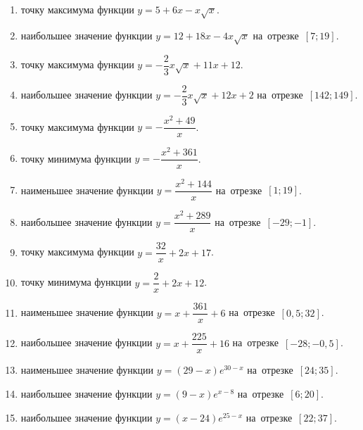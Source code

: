 \documentclass[a4paper,10pt]{article}
\begin{document}
\begin{enumerate}
\item {} точку максимума функции $y=5+6x -x\sqrt{x}$.

\item {} наибольшее значение функции $y=12+18x -4x\sqrt{x}$ на~отрезке~$\left[7;19\right]$.

\item {} точку максимума функции $y=-\dfrac{2}{3}x\sqrt{x} +11x+12$.

\item {} наибольшее значение функции $y=-\dfrac{2}{3}x\sqrt{x} +12x+2$ на~отрезке~$\left[142;149\right]$.

\item {} точку максимума функции $y=-\dfrac{x^2 +49}{x}$.

\item {} точку минимума функции $y=-\dfrac{x^2 +361}{x}$.

\item {} наименьшее значение функции $y=\dfrac{x^2 +144}{x}$ на~отрезке~$\left[1;19\right]$.

\item {} наибольшее значение функции $y=\dfrac{x^2 +289}{x}$ на~отрезке~$\left[-29;-1\right]$.

\item {} точку максимума функции $y=\dfrac{32}{x} +2x+17$.

\item {} точку минимума функции $y=\dfrac{2}{x} +2x+12$.

\item {} наименьшее значение функции $y=x+\dfrac{361}{x} +6$ на~отрезке~$\left[0,5;32\right]$.

\item {} наибольшее значение функции $y=x+\dfrac{225}{x} +16$ на~отрезке~$\left[-28;-0,5\right]$.

\item {} наименьшее значение функции $y=\left(29-x\right)e^{30-x}$ на~отрезке~$\left[24;35\right]$.

\item {} наибольшее значение функции $y=\left(9-x\right)e^{x-8}$ на~отрезке~$\left[6;20\right]$.

\item {} наибольшее значение функции $y=\left(x-24\right)e^{25-x}$ на~отрезке~$\left[22;37\right]$.


\end{enumerate}
\end{document}
